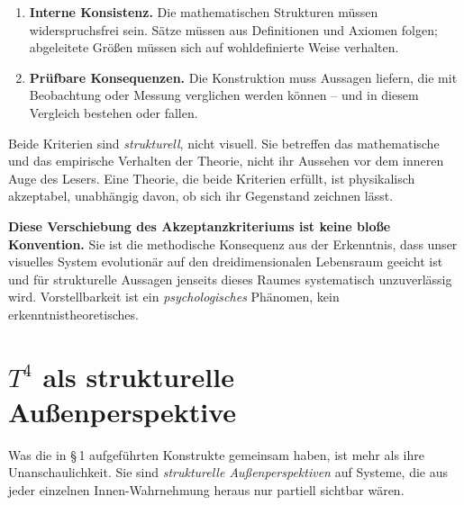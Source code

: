 \begin{enumerate}[leftmargin=2em,itemsep=4pt,topsep=4pt]
  \item \textbf{Interne Konsistenz.} Die mathematischen Strukturen
        müssen widerspruchsfrei sein. Sätze müssen aus Definitionen
        und Axiomen folgen; abgeleitete Größen müssen sich auf
        wohldefinierte Weise verhalten.

  \item \textbf{Prüfbare Konsequenzen.} Die Konstruktion muss
        Aussagen liefern, die mit Beobachtung oder Messung
        verglichen werden können -- und in diesem Vergleich
        bestehen oder fallen.
\end{enumerate}

Beide Kriterien sind \emph{strukturell}, nicht visuell. Sie betreffen
das mathematische und das empirische Verhalten der Theorie, nicht
ihr Aussehen vor dem inneren Auge des Lesers. Eine Theorie, die
beide Kriterien erfüllt, ist physikalisch akzeptabel, unabhängig
davon, ob sich ihr Gegenstand zeichnen lässt.

\textbf{Diese Verschiebung des Akzeptanzkriteriums ist keine bloße
Konvention.} Sie ist die methodische Konsequenz aus der Erkenntnis,
dass unser visuelles System evolutionär auf den dreidimensionalen
Lebensraum geeicht ist und für strukturelle Aussagen jenseits dieses
Raumes systematisch unzuverlässig wird. Vorstellbarkeit ist ein
\emph{psychologisches} Phänomen, kein erkenntnistheoretisches.

\section{$T^4$ als strukturelle Außenperspektive}

Was die in §\,1 aufgeführten Konstrukte gemeinsam haben, ist mehr
als ihre Unanschaulichkeit. Sie sind \emph{strukturelle
Außenperspektiven} auf Systeme, die aus jeder einzelnen
Innen-Wahrnehmung heraus nur partiell sichtbar wären.

